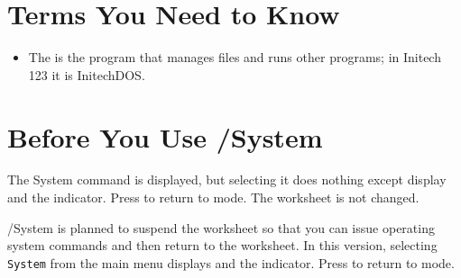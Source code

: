 \section{Terms You Need to Know}
\begin{itemize}
\item The  is the program that manages files and runs other programs; in Initech 123 it is InitechDOS.
\end{itemize}

\section{Before You Use /System}
\begin{Note}
The System command is displayed, but selecting it does nothing except display  and the  indicator.  Press  to return to  mode.  The worksheet is not changed.
\end{Note}

/System is planned to suspend the worksheet so that you can issue operating system commands and then return to the worksheet.  In this version, selecting \texttt{System} from the main menu displays  and the  indicator.  Press  to return to  mode.
